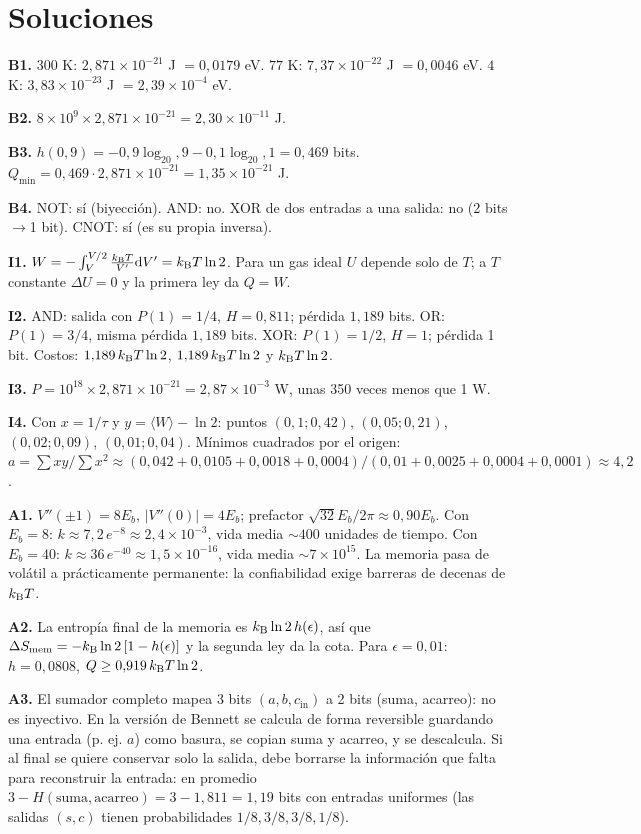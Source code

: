 \documentclass[11pt,a4paper]{article}
\begin{document}
\section{Soluciones}
\begin{solucion}
\textbf{B1.} $300$ K: $2{,}871\times10^{-21}$ J $=0{,}0179$ eV. $77$ K: $7{,}37\times10^{-22}$ J $=0{,}0046$ eV. $4$ K: $3{,}83\times10^{-23}$ J $=2{,}39\times10^{-4}$ eV.

\textbf{B2.} $8\times10^9\times2{,}871\times10^{-21}=2{,}30\times10^{-11}$ J.

\textbf{B3.} $h(0{,}9)=-0{,}9\log_20{,}9-0{,}1\log_20{,}1=0{,}469$ bits. $Q_{\min}=0{,}469\cdot2{,}871\times10^{-21}=1{,}35\times10^{-21}$ J.

\textbf{B4.} NOT: sí (biyección). AND: no. XOR de dos entradas a una salida: no (2 bits $\to$1 bit). CNOT: sí (es su propia inversa).

\textbf{I1.} $W=-\int_V^{V/2}\frac{k_{\mathrm B} T}{V'}\mathrm{d} V'=k_{\mathrm B} T\ln2$. Para un gas ideal $U$ depende solo de $T$; a $T$ constante $\Delta U=0$ y la primera ley da $Q=W$.

\textbf{I2.} AND: salida con $P(1)=1/4$, $H=0{,}811$; pérdida $1{,}189$ bits. OR: $P(1)=3/4$, misma pérdida $1{,}189$ bits. XOR: $P(1)=1/2$, $H=1$; pérdida 1 bit. Costos: $1{,}189\,k_{\mathrm B} T\ln2$, $1{,}189\,k_{\mathrm B} T\ln2$ y $k_{\mathrm B} T\ln2$.

\textbf{I3.} $P=10^{18}\times2{,}871\times10^{-21}=2{,}87\times10^{-3}$ W, unas 350 veces menos que 1 W.

\textbf{I4.} Con $x=1/\tau$ y $y=\langle W\rangle-\ln2$: puntos $(0{,}1;0{,}42)$, $(0{,}05;0{,}21)$, $(0{,}02;0{,}09)$, $(0{,}01;0{,}04)$. Mínimos cuadrados por el origen: $a=\sum xy/\sum x^2\approx(0{,}042+0{,}0105+0{,}0018+0{,}0004)/(0{,}01+0{,}0025+0{,}0004+0{,}0001)\approx4{,}2$.

\textbf{A1.} $V''(\pm1)=8E_b$, $|V''(0)|=4E_b$; prefactor $\sqrt{32}E_b/2\pi\approx0{,}90E_b$. Con $E_b=8$: $k\approx7{,}2\,e^{-8}\approx2{,}4\times10^{-3}$, vida media $\sim400$ unidades de tiempo. Con $E_b=40$: $k\approx36\,e^{-40}\approx1{,}5\times10^{-16}$, vida media $\sim7\times10^{15}$. La memoria pasa de volátil a prácticamente permanente: la confiabilidad exige barreras de decenas de $k_{\mathrm B} T$.

\textbf{A2.} La entropía final de la memoria es $k_{\mathrm B}\ln2\,h(\epsilon)$, así que $\Delta S_{\text{mem}}=-k_{\mathrm B}\ln2\,[1-h(\epsilon)]$ y la segunda ley da la cota. Para $\epsilon=0{,}01$: $h=0{,}0808$, $Q\ge0{,}919\,k_{\mathrm B} T\ln2$.

\textbf{A3.} El sumador completo mapea 3 bits $(a,b,c_{\text{in}})$ a 2 bits (suma, acarreo): no es inyectivo. En la versión de Bennett se calcula de forma reversible guardando una entrada (p. ej. $a$) como basura, se copian suma y acarreo, y se descalcula. Si al final se quiere conservar solo la salida, debe borrarse la información que falta para reconstruir la entrada: en promedio $3-H(\text{suma},\text{acarreo})=3-1{,}811=1{,}19$ bits con entradas uniformes (las salidas $(s,c)$ tienen probabilidades $1/8,3/8,3/8,1/8$).
\end{solucion}
\end{document}

